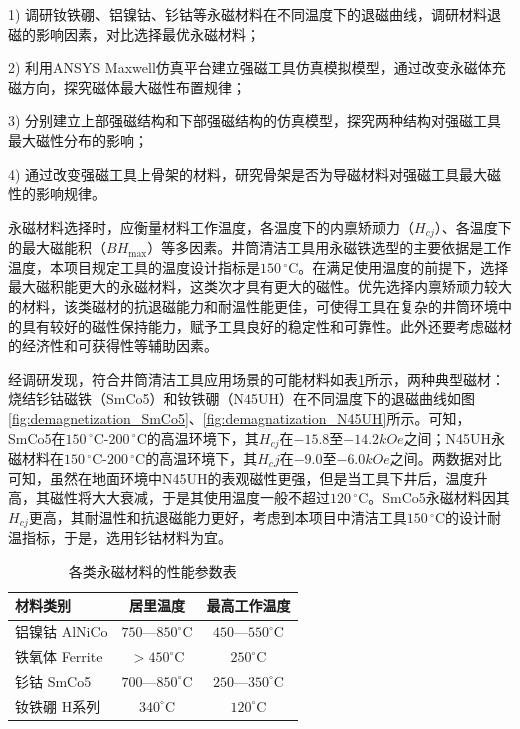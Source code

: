 1) 调研钕铁硼、铝镍钴、钐钴等永磁材料在不同温度下的退磁曲线，调研材料退磁的影响因素，对比选择最优永磁材料；

2) 利用ANSYS Maxwell仿真平台建立强磁工具仿真模拟模型，通过改变永磁体充磁方向，探究磁体最大磁性布置规律；

3) 分别建立上部强磁结构和下部强磁结构的仿真模型，探究两种结构对强磁工具最大磁性分布的影响；

4) 通过改变强磁工具上骨架的材料，研究骨架是否为导磁材料对强磁工具最大磁性的影响规律。


永磁材料选择时，应衡量材料工作温度，各温度下的内禀矫顽力（$H_{cj}$）、各温度下的最大磁能积（$BH_{\max}$）等多因素。井筒清洁工具用永磁铁选型的主要依据是工作温度，本项目规定工具的温度设计指标是$150\,^\circ\mathrm{C}$。在满足使用温度的前提下，选择最大磁积能更大的永磁材料，这类次才具有更大的磁性。优先选择内禀矫顽力较大的材料，该类磁材的抗退磁能力和耐温性能更佳，可使得工具在复杂的井筒环境中的具有较好的磁性保持能力，赋予工具良好的稳定性和可靠性。此外还要考虑磁材的经济性和可获得性等辅助因素。

经调研发现，符合井筒清洁工具应用场景的可能材料如表\ref{tab:magnet_params}所示，两种典型磁材：烧结钐钴磁铁（SmCo5）和钕铁硼（N45UH）在不同温度下的退磁曲线如图\ref{fig:demagnetization_SmCo5}、\ref{fig:demagnatization_N45UH}所示。可知，SmCo5在$150\,^\circ\mathrm{C}$-$200\,^\circ\mathrm{C}$的高温环境下，其$H_{cj}$在$-15.8$至$-14.2kOe$之间；N45UH永磁材料在$150\,^\circ\mathrm{C}$-$200\,^\circ\mathrm{C}$的高温环境下，其$H_cj$在$-9.0$至$-6.0kOe$之间。两数据对比可知，虽然在地面环境中N45UH的表观磁性更强，但是当工具下井后，温度升高，其磁性将大大衰减，于是其使用温度一般不超过$120\,^\circ\mathrm{C}$。SmCo5永磁材料因其$H_{cj}$更高，其耐温性和抗退磁能力更好，考虑到本项目中清洁工具$150\,^\circ\mathrm{C}$的设计耐温指标，于是，选用钐钴材料为宜。

\begin{table}[htbp]
    \centering
    \caption{各类永磁材料的性能参数表}
    \label{tab:magnet_params}
    \begin{tabularx}{.9\textwidth}{Xcc}
        \toprule %
        材料类别 & 居里温度 & 最高工作温度 \\
        \midrule %
        铝镍钴 AlNiCo & $750$—$850^\circ\text{C}$ & $450$—$550^\circ\text{C}$ \\
        铁氧体 Ferrite & $> 450^\circ\text{C}$ & $250^\circ\text{C}$ \\
        钐钴 SmCo5 & $700$—$850^\circ\text{C}$ & $250$—$350^\circ\text{C}$ \\
        钕铁硼 H系列 & $340^\circ\text{C}$ & $120^\circ\text{C}$ \\
        \bottomrule %
    \end{tabularx}
\end{table}

